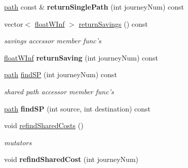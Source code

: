 \begin{DoxyCompactItemize}
\item 
\hypertarget{classgraphGroup_ad93eb3d25510287bdcaa94d3834e1e4e}{
\hyperlink{classpath}{path} const \& {\bfseries returnSinglePath} (int journeyNum) const }
\label{classgraphGroup_ad93eb3d25510287bdcaa94d3834e1e4e}

\item 
\hypertarget{classgraphGroup_a3f3dcb9014292a7bba337ec7c53614e3}{
vector$<$ \hyperlink{classfloatWInf}{floatWInf} $>$ \hyperlink{classgraphGroup_a3f3dcb9014292a7bba337ec7c53614e3}{returnSavings} () const }
\label{classgraphGroup_a3f3dcb9014292a7bba337ec7c53614e3}

\begin{DoxyCompactList}\small\item\em savings accessor member func's \end{DoxyCompactList}\item 
\hypertarget{classgraphGroup_afdffc0416658869277e94e2211869e9b}{
\hyperlink{classfloatWInf}{floatWInf} {\bfseries returnSaving} (int journeyNum) const }
\label{classgraphGroup_afdffc0416658869277e94e2211869e9b}

\item 
\hypertarget{classgraphGroup_a30a1b6f9c3bde4ce30e7cd026f28820d}{
\hyperlink{classpath}{path} \hyperlink{classgraphGroup_a30a1b6f9c3bde4ce30e7cd026f28820d}{findSP} (int journeyNum) const }
\label{classgraphGroup_a30a1b6f9c3bde4ce30e7cd026f28820d}

\begin{DoxyCompactList}\small\item\em shared path accessor member func's \end{DoxyCompactList}\item 
\hypertarget{classgraphGroup_a283df710a10b5e646a469a17bd07ac01}{
\hyperlink{classpath}{path} {\bfseries findSP} (int source, int destination) const }
\label{classgraphGroup_a283df710a10b5e646a469a17bd07ac01}

\item 
\hypertarget{classgraphGroup_ae0317d10b88009b14dc2ed4239c57018}{
void \hyperlink{classgraphGroup_ae0317d10b88009b14dc2ed4239c57018}{refindSharedCosts} ()}
\label{classgraphGroup_ae0317d10b88009b14dc2ed4239c57018}

\begin{DoxyCompactList}\small\item\em mutators \end{DoxyCompactList}\item 
\hypertarget{classgraphGroup_a5dae1d972088c99bfdeb2f5a8bc0be93}{
void {\bfseries refindSharedCost} (int journeyNum)}
\label{classgraphGroup_a5dae1d972088c99bfdeb2f5a8bc0be93}


\end{DoxyCompactItemize}
